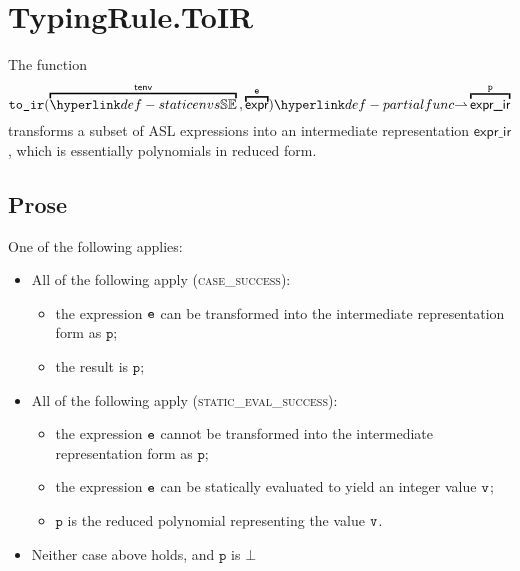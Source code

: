 \documentclass{book}
\newcommand\toir[0]{\texttt{to\_ir}}
\newcommand\exprir[0]{\textsf{expr\_ir}}
\newcommand\vp[0]{\texttt{p}}
\begin{document}
\section{TypingRule.ToIR}
The function
\[
  \toir(\overname{\staticenvs}{\tenv} \aslsep \overname{\expr}{\ve}) \partialto \overname{\exprir}{\vp}
\]
transforms a subset of ASL expressions into
an intermediate representation $\exprir$, which is essentially polynomials in reduced form.

\subsection{Prose}
One of the following applies:
\begin{itemize}
  \item All of the following apply (\textsc{case\_success}):
  \begin{itemize}
    \item the expression $\texttt{e}$ can be transformed into the intermediate representation form as $\vp$;
    \item the result is $\vp$;
  \end{itemize}

  \item All of the following apply (\textsc{static\_eval\_success}):
  \begin{itemize}
    \item the expression $\texttt{e}$ cannot be transformed into the intermediate representation form as $\vp$;
    \item the expression $\texttt{e}$ can be statically evaluated to yield an integer value $\texttt{v}$;
    \item $\vp$ is the reduced polynomial representing the value $\texttt{v}$.
  \end{itemize}

  \item Neither case above holds, and $\vp$ is $\bot$
\end{itemize}
\end{document}
